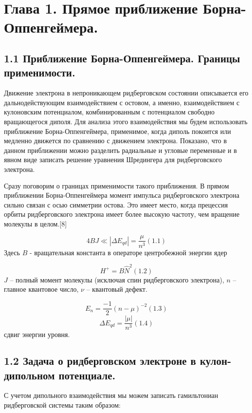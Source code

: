\documentclass[a4paper]{article}
\title{}
\author{}
\date{2016-07-10}
\begin{document}
\clearpage\section{Глава 1. Прямое
приближение
Борна-Оппенгеймера.}
\hypertarget{RefHeading4669463868395}{}\subsection{1.1
Приближение Борна-Оппенгеймера. Границы
применимости.}
\hypertarget{RefHeading4671463868395}{}Движение
электрона в непроникающем ридберговском состоянии описывается его дальнодействующим взаимодействием с остовом, а именно, взаимодействием с кулоновским потенциалом, комбинированным с потенциалом свободно вращающегося диполя. Для анализа этого взаимодействия мы будем использовать приближение Борна-Оппенгеймера, применимое, когда диполь покоится или медленно движется по сравнению с движением электрона. Показано, что в данном приближении можно разделить радиальные и угловые переменные и в явном виде записать решение уравнения Шредингера для ридберговского электрона.

Сразу поговорим о границах применимости такого приближения. В прямом приближении Борна-Оппенгеймера момент импульса ридберговского электрона сильно связан с осью симметрии остова. Это имеет место, когда прецессия орбиты ридберговского электрона имеет более высокую частоту, чем вращение молекулы в целом.[8]

\begin{equation*}
4\mathit{BJ}{\ll}\left|{\Delta}E_{\mathit{qd}}\right|=\frac{\mu }{n^3}(1.1)
\end{equation*}
Здесь  $B$ -
вращательная константа в операторе центробежной энергии ядер

\begin{equation*}
	H^{+}=B\widehat  N^2(1.2)
\end{equation*}
$J$ -- полный момент молекулы (исключая спин ридберговского электрона),
$n$ -- главное квантовое число,
$\nu$ -- квантовый дефект.

\begin{equation*}
E_n=\frac{-1} 2\left(n-\mu \right)^{-2}(1.3)
\end{equation*}
\begin{equation*}
{\Delta}E_{\mathit{qd}}= \frac {|\mu|} {n^3}(1.4)
\end{equation*}
сдвиг энергии уровня.

\subsection{1.2 Задача о
ридберговском электроне в кулон-дипольном
потенциале.}
\hypertarget{RefHeading4673463868395}{}С учетом
дипольного взаимодействия мы можем записать гамильтониан ридберговской системы таким образом:
\end{document}
